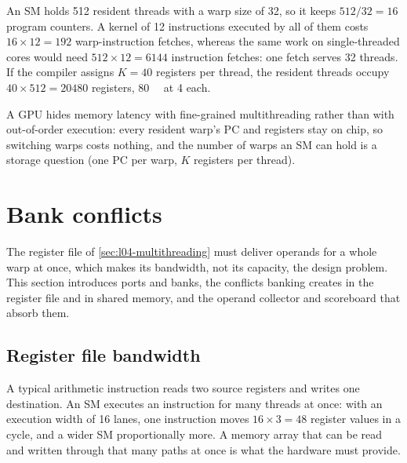 \documentclass[../main.tex]{subfiles}
\begin{document}
\begin{example}
  \label{ex:l04-resources}
  An SM holds \num{512} resident threads with a warp size of 32, so it
  keeps $512 / 32 = 16$ program counters.  A kernel of \num{12}
  instructions executed by all of them costs
  $16 \times 12 = 192$ warp-instruction fetches, whereas the same work
  on single-threaded cores would need $512 \times 12 = \num{6144}$
  instruction fetches: one fetch serves 32 threads.  If the compiler
  assigns $K = 40$ registers per thread, the resident threads occupy
  $40 \times 512 = \num{20480}$ registers, \SI{80}{\kibi\byte} at
  \SI{4}{\byte} each.
\end{example}

\begin{keypoint}
  A GPU hides memory latency with fine-grained multithreading rather
  than with out-of-order execution: every resident warp's PC and
  registers stay on chip, so switching warps costs nothing, and the
  number of warps an SM can hold is a storage question (one PC per
  warp, $K$ registers per thread).
\end{keypoint}

\section{Bank conflicts}
\label{sec:l04-bank-conflicts}

The register file of \cref{sec:l04-multithreading} must deliver operands for a
whole warp at once, which makes its bandwidth, not its capacity, the
design problem.  This section introduces ports and banks,
the conflicts banking creates in the register file and in shared memory,
and the operand collector and scoreboard that absorb them.

\subsection{Register file bandwidth}

A typical arithmetic instruction reads two source registers and writes
one destination.  An SM executes an instruction for many threads at
once: with an execution width of 16 lanes, one instruction moves
$16 \times 3 = 48$ register values in a cycle, and a wider SM
proportionally more.  A memory array that can be read and written through
that many paths at once is what the hardware must provide.
\end{document}
